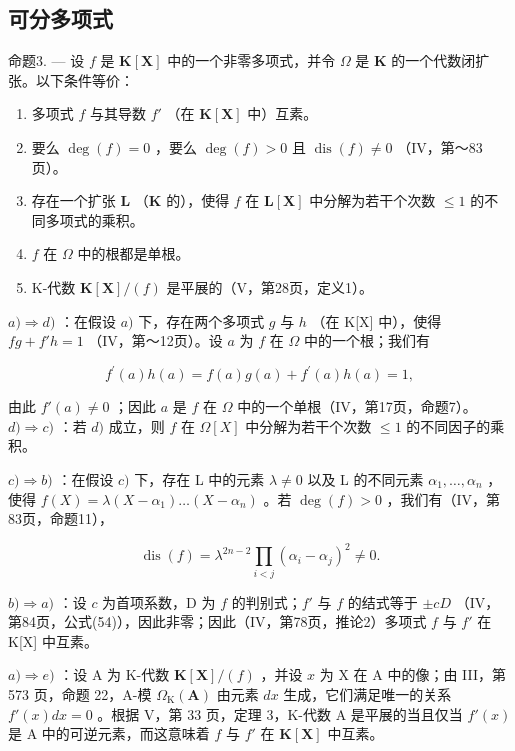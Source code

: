 \subsection{可分多项式}

命题3. --- 设 \(f\) 是 \(\mathbf{K}[\mathbf{X}]\) 中的一个非零多项式，并令 \(\Omega\) 是 \(\mathbf{K}\) 的一个代数闭扩张。以下条件等价：

\begin{enumerate}
\def\labelenumi{\alph{enumi})}
\item
  多项式 \(f\) 与其导数 \(f'\) （在 \(\mathbf{K}[\mathbf{X}]\) 中）互素。
\item
  要么 \(\deg(f) = 0\) ，要么 \(\deg(f) > 0\) 且 \(\operatorname{dis}(f) \neq 0\) （IV，第～83页）。
\item
  存在一个扩张 \(\mathbf{L}\) （\(\mathbf{K}\) 的），使得 \(f\) 在 \(\mathbf{L}[\mathbf{X}]\) 中分解为若干个次数 \(\leqslant 1\) 的不同多项式的乘积。
\item
  \(f\) 在 \(\Omega\) 中的根都是单根。
\item
  K-代数 \(\mathbf{K}[\mathbf{X}] / (f)\) 是平展的（V，第28页，定义1）。
\end{enumerate}

\(a) \Rightarrow d)\) ：在假设 \(a)\) 下，存在两个多项式 \(g\) 与 \(h\) （在 K{[}X{]} 中），使得 \(fg + f'h = 1\) （IV，第～12页）。设 \(a\) 为 \(f\) 在 \(\Omega\) 中的一个根；我们有

\[
f ^ {\prime} (a) h (a) = f (a) g (a) + f ^ {\prime} (a) h (a) = 1,
\]

由此 \(f'(a) \neq 0\) ；因此 \(a\) 是 \(f\) 在 \(\Omega\) 中的一个单根（IV，第17页，命题7）。 \(d) \Rightarrow c)\) ：若 \(d)\) 成立，则 \(f\) 在 \(\Omega[X]\) 中分解为若干个次数 \(\leqslant 1\) 的不同因子的乘积。

\(c) \Rightarrow b)\) ：在假设 \(c)\) 下，存在 L 中的元素 \(\lambda \neq 0\) 以及 L 的不同元素 \(\alpha_{1}, \ldots, \alpha_{n}\) ，使得 \(f(X) = \lambda(X - \alpha_{1}) \ldots (X - \alpha_{n})\) 。若 \(\deg(f) > 0\) ，我们有（IV，第83页，命题11），

\[
\operatorname{dis} (f) = \lambda^ {2 n - 2} \prod_ {i <   j} (\alpha_ {i} - \alpha_ {j}) ^ {2} \neq 0.
\]

\(b) \Rightarrow a)\) ：设 \(c\) 为首项系数，D 为 \(f\) 的判别式；\(f'\) 与 \(f\) 的结式等于 \(\pm cD\) （IV，第84页，公式(54)），因此非零；因此（IV，第78页，推论2）多项式 \(f\) 与 \(f'\) 在 K{[}X{]} 中互素。

\(a) \Rightarrow e)\) ：设 A 为 K-代数 \(\mathbf{K}[\mathbf{X}] / (f)\) ，并设 \(x\) 为 X 在 A 中的像；由 III，第 573 页，命题 22，A-模 \(\Omega_{\mathrm{K}}(\mathbf{A})\) 由元素 \(dx\) 生成，它们满足唯一的关系 \(f'(x) dx = 0\) 。根据 V，第 33 页，定理 3，K-代数 A 是平展的当且仅当 \(f'(x)\) 是 A 中的可逆元素，而这意味着 \(f\) 与 \(f'\) 在 \(\mathbf{K}[\mathbf{X}]\) 中互素。

